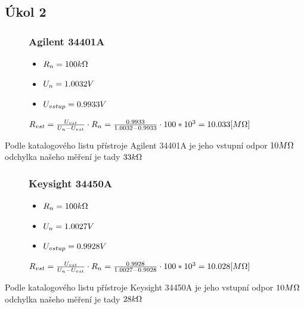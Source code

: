 \documentclass{article}
\begin{document}
\subsection*{Úkol 2}

\begin{figure}[H]
    \begin{minipage}[t]{0.3\textwidth}
        \subsubsection*{Agilent 34401A}
        \begin{itemize}
            \item \(R_n = 100\-k\Omega\) 
            \item \(U_n = 1.0032\-V\) 
            \item \(U_{vstup} = 0.9933\-V\) 
        \end{itemize}
    \end{minipage}
    \hfill
    \begin{minipage}[t]{0.7\textwidth}
        \vspace{10mm}
        \(
            R_{vst} = \frac{U_{vst}}{U_{n}-U_{vst}}\cdot R_n = \frac{0.9933}{1.0032-0.9933}\cdot 100*10^3 = 10.033\-[M\Omega]  
        \)
    \end{minipage}
\end{figure}
Podle katalogového listu přístroje Agilent 34401A je jeho vstupní odpor \(10\-M\Omega \)\\odchylka našeho měření je tady \(33\-k\Omega\)

\begin{figure}[H]
    \begin{minipage}[t]{0.3\textwidth}
        \subsubsection*{Keysight 34450A}
        \begin{itemize}
            \item \(R_n = 100\-k\Omega\) 
            \item \(U_n = 1.0027\-V\) 
            \item \(U_{vstup} = 0.9928\-V\) 
        \end{itemize}
    \end{minipage}
    \hfill
    \begin{minipage}[t]{0.7\textwidth}
        \vspace{10mm}
        \(
            R_{vst} = \frac{U_{vst}}{U_{n}-U_{vst}}\cdot R_n = \frac{0.9928}{1.0027-0.9928}\cdot 100*10^3 = 10.028\-[M\Omega]  
        \)
    \end{minipage}
\end{figure}
Podle katalogového listu přístroje Keysight 34450A je jeho vstupní odpor \(10\-M\Omega \)\\odchylka našeho měření je tady \(28\-k\Omega\)
\end{document}
